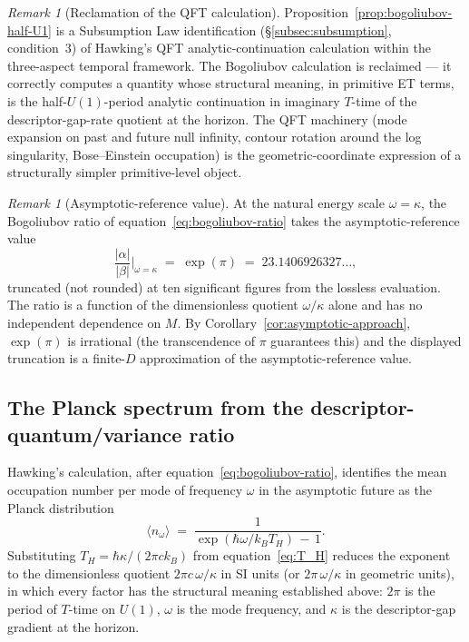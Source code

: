 \documentclass[11pt,a4paper]{article}
\theoremstyle{definition}
\theoremstyle{remark}
\newtheorem{remark}[theorem]{Remark}
\begin{document}
\begin{remark}[Reclamation of the QFT calculation]\label{rem:bogoliubov-reclaim}
Proposition~\ref{prop:bogoliubov-half-U1} is a Subsumption Law identification (\S\ref{subsec:subsumption}, condition~3) of Hawking's QFT analytic-continuation calculation within the three-aspect temporal framework. The Bogoliubov calculation is reclaimed --- it correctly computes a quantity whose structural meaning, in primitive ET terms, is the half-$U(1)$-period analytic continuation in imaginary $T$-time of the descriptor-gap-rate quotient at the horizon. The QFT machinery (mode expansion on past and future null infinity, contour rotation around the log singularity, Bose--Einstein occupation) is the geometric-coordinate expression of a structurally simpler primitive-level object.
\end{remark}

\begin{remark}[Asymptotic-reference value]\label{rem:bogoliubov-asymptotic}
At the natural energy scale $\omega = \kappa$, the Bogoliubov ratio of equation~\eqref{eq:bogoliubov-ratio} takes the asymptotic-reference value
\[
\frac{|\alpha|}{|\beta|}\Big|_{\omega=\kappa} \;=\; \exp(\pi) \;=\; 23.1406926327\ldots,
\]
truncated (not rounded) at ten significant figures from the lossless evaluation. The ratio is a function of the dimensionless quotient $\omega/\kappa$ alone and has no independent dependence on $M$. By Corollary~\ref{cor:asymptotic-approach}, $\exp(\pi)$ is irrational (the transcendence of $\pi$ guarantees this) and the displayed truncation is a finite-$D$ approximation of the asymptotic-reference value.
\end{remark}

\subsection{The Planck spectrum from the descriptor-quantum/variance ratio}\label{subsec:planck-spectrum}

Hawking's calculation, after equation~\eqref{eq:bogoliubov-ratio}, identifies the mean occupation number per mode of frequency $\omega$ in the asymptotic future as the Planck distribution
\begin{equation}\label{eq:planck-occupation}
\langle n_{\omega}\rangle \;=\; \frac{1}{\exp(\hbar\omega/k_{B}T_{H}) \,-\, 1}.
\end{equation}
Substituting $T_{H} = \hbar\kappa/(2\pi c k_{B})$ from equation~\eqref{eq:T_H} reduces the exponent to the dimensionless quotient $2\pi c\,\omega/\kappa$ in SI units (or $2\pi\,\omega/\kappa$ in geometric units), in which every factor has the structural meaning established above: $2\pi$ is the period of $T$-time on $U(1)$, $\omega$ is the mode frequency, and $\kappa$ is the descriptor-gap gradient at the horizon.
\end{document}
